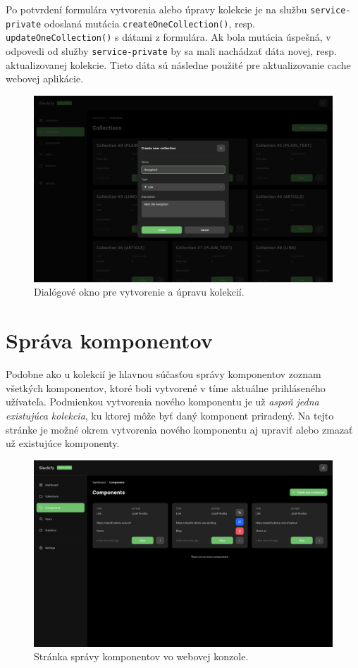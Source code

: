 \noindent Po potvrdení formulára vytvorenia alebo úpravy kolekcie je na službu \texttt{service-private} odoslaná mutácia \texttt{createOneCollection()}, resp. \texttt{updateOneCollection()} s dátami z formulára. Ak bola mutácia úspešná, v odpovedi od služby \texttt{service-private} by sa mali nachádzať dáta novej, resp. aktualizovanej kolekcie. Tieto dáta sú následne použité pre aktualizovanie cache webovej aplikácie.

\begin{figure}[h]
	\centering
	\includegraphics[scale=0.085]{obrazky-figures/screenshot_collection_create}
	\caption{Dialógové okno pre vytvorenie a úpravu kolekcií.}
\end{figure}

\section{Správa komponentov}
Podobne ako u kolekcií je hlavnou súčasťou správy komponentov zoznam všetkých komponentov, ktoré boli vytvorené v tíme aktuálne prihláseného užívateľa. Podmienkou vytvorenia nového komponentu je už \emph{aspoň jedna existujúca kolekcia}, ku ktorej môže byť daný komponent priradený. Na tejto stránke je možné okrem vytvorenia nového komponentu aj upraviť alebo zmazať už existujúce komponenty.

\begin{figure}[h]
	\centering
	\includegraphics[scale=0.085]{obrazky-figures/screenshot_components}
	\caption{Stránka správy komponentov vo webovej konzole.}
\end{figure}

